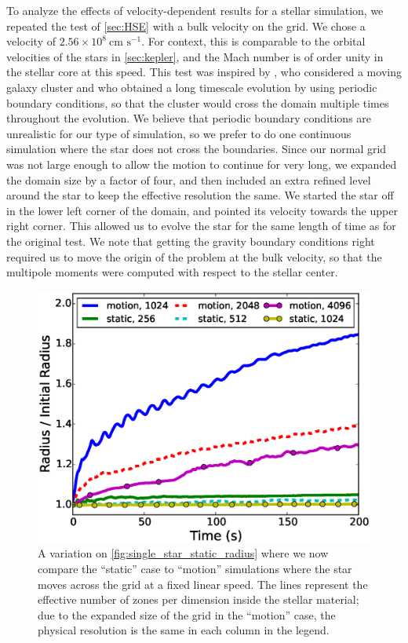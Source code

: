 \documentclass[iop]{../emulateapj}
\begin{document}
To analyze the effects of velocity-dependent results for a stellar simulation, we repeated the
test of \autoref{sec:HSE} with a bulk velocity on the grid. We chose a
velocity of $2.56 \times 10^{8}\ \text{cm s}^{-1}$. For context, this is 
comparable to the orbital velocities of the stars in \autoref{sec:kepler}, and the Mach
number is of order unity in the stellar core at this speed.  This test
was inspired by \citet{tasker:2008}, who considered a moving galaxy
cluster and who obtained a long timescale evolution by using
periodic boundary conditions, so that the cluster would cross the
domain multiple times throughout the evolution.  We believe that
periodic boundary conditions are unrealistic for our type of
simulation, so we prefer to do one continuous simulation where the
star does not cross the boundaries.  Since our normal grid was not
large enough to allow the motion to continue for very long, we
expanded the domain size by a factor of four, and then included an
extra refined level around the star to keep the effective resolution
the same. We started the star off in the lower left corner of the
domain, and pointed its velocity towards the upper right
corner. This allowed us to evolve the star for the same length of
time as for the original test. We note that getting the gravity
boundary conditions right required us to move the origin of the
problem at the bulk velocity, so that the multipole moments were
computed with respect to the stellar center.

\begin{figure}
  \centering
  \includegraphics[scale=0.45]{plots/single_star_compare_1e3_radius}
  \caption{A variation on \autoref{fig:single_star_static_radius} where
    we now compare the ``static'' case to ``motion'' simulations where the 
    star moves across the grid at a fixed linear speed. The lines represent 
    the effective number of zones per dimension inside the stellar material;
    due to the expanded size of the grid in the ``motion'' case, the 
    physical resolution is the same in each column in the legend.
    \label{fig:single_star_compare_radius}}
\end{figure}
\end{document}
